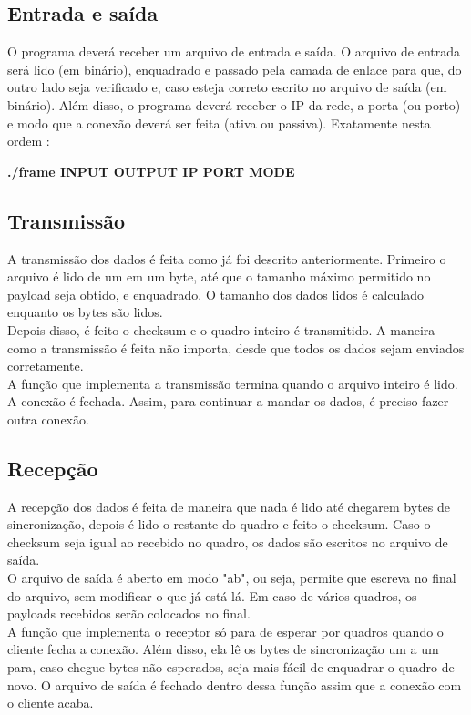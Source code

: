 \documentclass[10pt]{article}
\begin{document}
		\subsection{Entrada e saída}
			O programa deverá receber um arquivo de entrada e saída. O arquivo de entrada será lido (em binário), enquadrado e passado pela camada de enlace para que, do outro lado seja verificado e, caso esteja correto escrito no arquivo de saída (em binário).
			Além disso, o programa deverá receber o IP da rede, a porta (ou porto) e modo que a conexão deverá ser feita (ativa ou passiva). Exatamente nesta ordem :
			
			\textbf{./frame INPUT OUTPUT IP PORT MODE}
		\subsection{Transmissão}
			A transmissão dos dados é feita como já foi descrito anteriormente. Primeiro o arquivo é lido de um em um byte, até que o tamanho máximo permitido no payload seja obtido, e enquadrado. O tamanho dos dados lidos é calculado enquanto os bytes são lidos. 
			\\Depois disso, é feito o checksum e o quadro inteiro é transmitido. A maneira como a transmissão é feita não importa, desde que todos os dados sejam enviados corretamente.
			\\A função que implementa a transmissão termina quando o arquivo inteiro é lido. A conexão é fechada. Assim, para continuar a mandar os dados, é preciso fazer outra conexão.
		\subsection{Recepção}
			A recepção dos dados é feita de maneira que nada é lido até chegarem bytes de sincronização, depois é lido o restante do quadro e feito o checksum. Caso o checksum seja igual ao recebido no quadro, os dados são escritos no arquivo de saída.
			\\O arquivo de saída é aberto em modo "ab", ou seja, permite que escreva no final do arquivo, sem modificar o que já está lá. Em caso de vários quadros, os payloads recebidos serão colocados no final.
			\\A função que implementa o receptor só para de esperar por quadros quando o cliente fecha a conexão. Além disso, ela lê os bytes de sincronização um a um para, caso chegue bytes não esperados, seja mais fácil de enquadrar o quadro de novo. O arquivo de saída é fechado dentro dessa função assim que a conexão com o cliente acaba.
\end{document}
